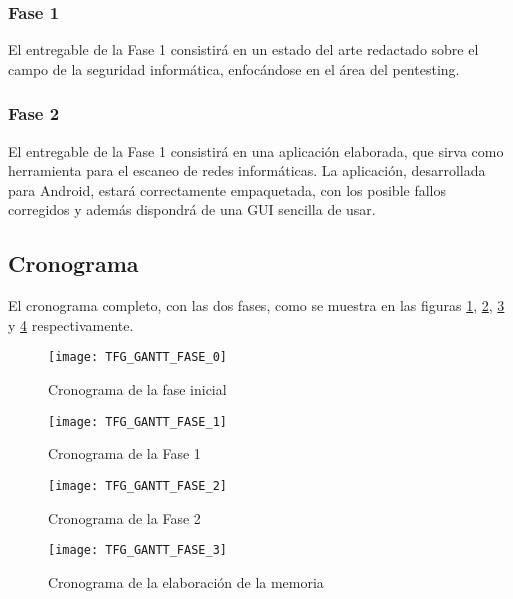 \subsubsection{Fase 1}
El entregable de la Fase 1 consistirá en un estado del arte redactado sobre el campo de la seguridad informática, enfocándose en el área del pentesting.

\subsubsection{Fase 2}
El entregable de la Fase 1 consistirá en una aplicación elaborada, que sirva como herramienta para el escaneo de redes informáticas. La aplicación, desarrollada para Android, estará correctamente empaquetada, con los posible fallos corregidos y además dispondrá de una GUI sencilla de usar.

\subsection{Cronograma}
El cronograma completo, con las dos fases, como se muestra en las figuras \ref{fig:gantt0}, \ref{fig:gantt1}, \ref{fig:gantt2} y \ref{fig:gantt3} respectivamente.

\begin{figure}[H]
	\centering
	\texttt{[image: TFG\_GANTT\_FASE\_0]}
	\caption{Cronograma de la fase inicial}
	\label{fig:gantt0}
\end{figure}

\begin{landscape}

\begin{figure}[H]
	\centering
	\texttt{[image: TFG\_GANTT\_FASE\_1]}
	\caption{Cronograma de la Fase 1}
	\label{fig:gantt1}
\end{figure}

\begin{figure}[H]
	\centering
	\texttt{[image: TFG\_GANTT\_FASE\_2]}
	\caption{Cronograma de la Fase 2}
	\label{fig:gantt2}
\end{figure}

\end{landscape}

\begin{figure}[H]
	\centering
	\texttt{[image: TFG\_GANTT\_FASE\_3]}
	\caption{Cronograma de la elaboración de la memoria}
	\label{fig:gantt3}
\end{figure}



